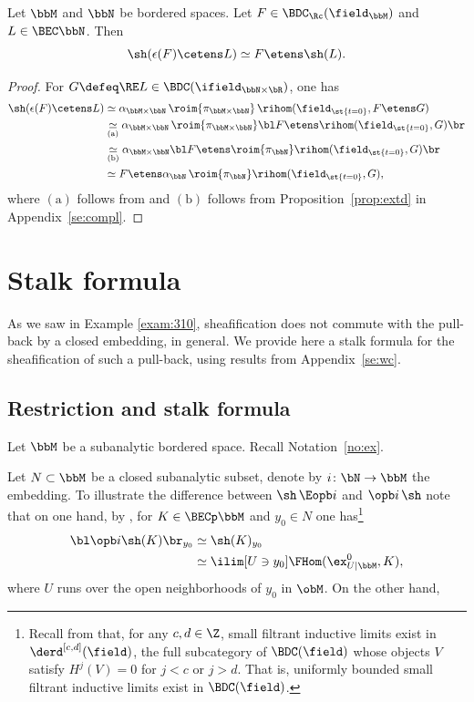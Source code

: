 \begin{lemma}\label{lem:shetens}
Let $\bbM$ and $\bbN$ be bordered spaces.
Let $F\in\BDC_\Rc(\field_\bbM)$ and $L\in\BEC\bbN$. Then
\[
\sh(\epsilon(F)\cetens L) \simeq F \etens \sh(L).
\]
\end{lemma}

\begin{proof}
For $G\defeq\RE L\in\BDC(\ifield_{\bbN\times\bR})$, one has
\begin{align*}
\sh(\epsilon(F)\cetens L)
&\simeq \alpha_{\bbM\times\bbN}\,\roim{{\pi_{\bbM\times\bbN}}}\,\rihom(\field_{\st{t= 0}}, F\etens G) \\
&\underset{(\text{a})}\simeq \alpha_{\bbM\times\bbN}\,\roim{{\pi_{\bbM\times\bbN}}}
\bl F\etens\rihom(\field_{\st{t= 0}}, G)\br \\
&\underset{(\text{b})}\simeq \alpha_{\bbM\times\bbN}\bl F\etens
\roim{{\pi_{\bbN}}}\rihom(\field_{\st{t= 0}}, G)\br \\
&\simeq F\etens\alpha_\bbN\,\roim{{\pi_\bbN}}\rihom(\field_{\st{t= 0}}, G) ,
\end{align*}
where $(\text{a})$ follows from \cite[Cor.\,2.3.5]{DK16}
and $(\text{b})$ follows from Proposition~\ref{prop:extd} in Appendix~\ref{se:compl}.
\end{proof}

\section{Stalk formula}\label{se:germ}

As we saw in Example \ref{exam:310}, sheafification does not commute with the pull-back by a closed embedding, in general. We provide here a stalk formula for the sheafification of such a pull-back, using results from Appendix~\ref{se:wc}.

\subsection{Restriction and stalk formula}

Let $\bbM$ be a subanalytic bordered space.
Recall Notation~\ref{no:ex}.

Let $N\subset\bbM$ be a closed subanalytic subset, denote by $i\colon \bN\to \bbM$ the embedding.
To illustrate the difference between $\sh\,\Eopb i$ and $\opb i \, \sh$ note that on one hand, by \hbox{\cite[Lem.\,2.4.1]{DK18}}, for $K\in\BECp \bbM$ and $y_0\in N$ one has\footnote{Recall from \cite[\S2.1]{DK18} that, for any $c,d\in\Z$, small filtrant inductive limits exist in $\derd^{[c,d]}(\field)$, the full subcategory of $\BDC(\field)$ whose objects $V$ satisfy $H^j(V)=0$ for $j<c$ or $j>d$. That is, uniformly bounded small filtrant inductive limits exist in $\BDC(\field)$.}
\begin{align*}
\bl \opb i \sh(K)\br_{y_0} &\simeq
\sh(K)_{y_0} \\ &\simeq
\ilim[U\owns y_0]\FHom(\ex^0_{U|\bbM},K),
\end{align*}
where $U$ runs over the open neighborhoods of $y_0$ in $\obM$.
On the other hand,

